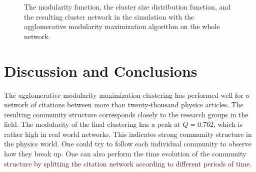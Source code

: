 \documentclass{article} %
\begin{document}
\begin{figure}[h]
  	\centering
	\vspace{-20pt}
 	\caption{The modularity function, the cluster size distribution function, and the resulting cluster network in the simulation with the agglomerative modularity maximization algorithm on the whole network.}
 	\vspace{-10pt}
  \label{fig:modularity_whole}
\end{figure}

\section{Discussion and Conclusions}

The agglomerative modularity maximization clustering has performed well for a network of citations between more than twenty-thousand physics articles. The resulting community structure corresponds closely to the research groups in the field. The modularity of the final clustering has a peak at $Q=0.762$, which is rather high in real world networks. This indicates strong community structure in the physics world. One could try to follow each individual community to observe how they break up. One can also perform the time evolution of the community structure by splitting the citation network according to different periods of time. 
\end{document}
